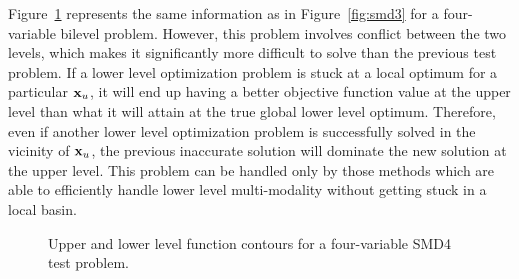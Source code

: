\documentclass[twoside]{article}
\begin{document}
Figure~\ref{fig:smd4} represents the same information as in Figure~\ref{fig:smd3} for a four-variable bilevel problem. However, this problem involves conflict between the two levels, which makes it significantly more difficult to solve than the previous test problem. If a lower level optimization problem is stuck at a local optimum for a particular $\mbox{$\mathbf{x}$}_u$, it will end up having a better objective function value at the upper level than what it will attain at the true global lower level optimum. Therefore, even if another lower level optimization problem is successfully solved in the vicinity of $\mbox{$\mathbf{x}$}_{u}$, the previous inaccurate solution will dominate the new solution at the upper level. This problem can be handled only by those methods which are able to efficiently handle lower level multi-modality without getting stuck in a local basin.

\begin{figure}
\begin{center}
\caption{Upper and lower level function contours for a four-variable SMD4 test problem.}
\label{fig:smd4}
\end{center}
\end{figure}
\end{document}
